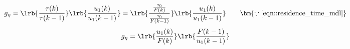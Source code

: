 \begin{align*}
        g_{\eta} &= \lrb{\frac{\tau(k)}{\tau(k-1)}}
                                \lrb{\frac{u_1(k)}{u_1(k-1)}}
                = \lrb{\frac{\frac{\tau_0}{F(k)}}{\frac{\tau_0}{F(k-1)}}} \lrb{\frac{u_1(k)}{u_1(k-1)}}
                \qquad \bm{\because \ref{eqn::residence_time_mdl}}
\end{align*}
\begin{align}
        g_{\eta} &= \lrb{\frac{u_1(k)}{F(k)}} \lrb{\frac{F(k-1)}{u_1(k-1)}}
\end{align}
